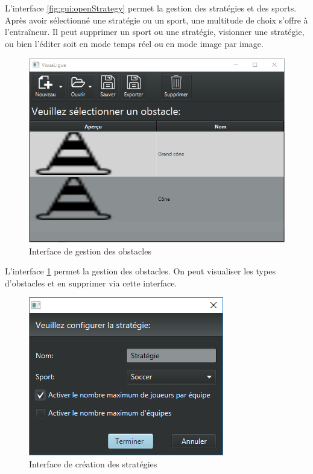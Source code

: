 L'interface \ref{fig:gui:openStrategy} permet la gestion des stratégies et des sports.
Après avoir sélectionné une stratégie ou un sport, une multitude de choix s'offre à l'entraîneur.
Il peut supprimer un sport ou une stratégie, visionner une stratégie, ou bien l'éditer soit en mode temps réel ou en mode image par image.
\newpage

\begin{figure}[htpb]
    \centering
    \includegraphics[scale=0.6]{fig/gui/openObstacle.png}
    \caption{Interface de gestion des obstacles}
    \label{fig:gui:openObstacle}
\end{figure}

L'interface \ref{fig:gui:openObstacle} permet la gestion des obstacles.
On peut visualiser les types d'obstacles et en supprimer via cette interface.

\newpage

\begin{figure}[htpb]
    \centering
    \includegraphics[scale=0.6]{fig/gui/newStrategy.png}
    \caption{Interface de création des stratégies}
    \label{fig:gui:newStrategy}
\end{figure}


